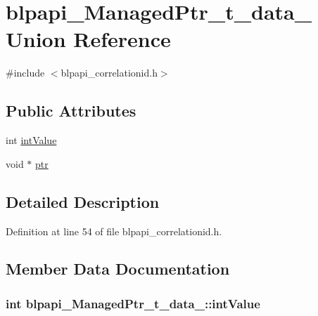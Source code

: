 \hypertarget{unionblpapi___managed_ptr__t__data__}{}\section{blpapi\+\_\+\+Managed\+Ptr\+\_\+t\+\_\+data\+\_\+ Union Reference}
\label{unionblpapi___managed_ptr__t__data__}


{\ttfamily \#include $<$blpapi\+\_\+correlationid.\+h$>$}

\subsection*{Public Attributes}
\begin{DoxyCompactItemize}
\item 
int \hyperlink{unionblpapi___managed_ptr__t__data___a375fb22840987a774d744e22ec0535d4}{int\+Value}
\item 
void $\ast$ \hyperlink{unionblpapi___managed_ptr__t__data___a397e20f80527b2fa6b6f6389148df400}{ptr}
\end{DoxyCompactItemize}


\subsection{Detailed Description}


Definition at line 54 of file blpapi\+\_\+correlationid.\+h.



\subsection{Member Data Documentation}
\subsubsection[{\texorpdfstring{int\+Value}{intValue}}]{\setlength{\rightskip}{0pt plus 5cm}int blpapi\+\_\+\+Managed\+Ptr\+\_\+t\+\_\+data\+\_\+\+::int\+Value}\hypertarget{unionblpapi___managed_ptr__t__data___a375fb22840987a774d744e22ec0535d4}{}\label{unionblpapi___managed_ptr__t__data___a375fb22840987a774d744e22ec0535d4}


